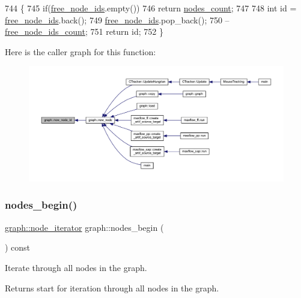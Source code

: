 \begin{DoxyCode}
744 \{
745     \textcolor{keywordflow}{if}(\mbox{\hyperlink{classgraph_ae3f535853434924927a21d7725445aab}{free\_node\_ids}}.empty())
746     \textcolor{keywordflow}{return} \mbox{\hyperlink{classgraph_a1f59223d0bcf647920963d7a661dd74a}{nodes\_count}};
747    
748     \textcolor{keywordtype}{int} \textcolor{keywordtype}{id} = \mbox{\hyperlink{classgraph_ae3f535853434924927a21d7725445aab}{free\_node\_ids}}.back();
749     \mbox{\hyperlink{classgraph_ae3f535853434924927a21d7725445aab}{free\_node\_ids}}.pop\_back();
750     --\mbox{\hyperlink{classgraph_a9480e2310fe64c3a8ad295bb3f119772}{free\_node\_ids\_count}};
751     \textcolor{keywordflow}{return} id;
752 \}
\end{DoxyCode}
Here is the caller graph for this function\+:\nopagebreak
\begin{figure}[H]
\begin{center}
\leavevmode
\includegraphics[width=350pt]{classgraph_a4c9af44fa03250994dd1dd972bd7cdfc_icgraph}
\end{center}
\end{figure}
\mbox{\label{classgraph_aec053a4b509d1be804237a80044c54c0}} 
\subsubsection{\texorpdfstring{nodes\+\_\+begin()}{nodes\_begin()}}
{\footnotesize\ttfamily \mbox{\hyperlink{classgraph_a2cb374b84c133ce13f94e73c3e5da7fa}{graph\+::node\+\_\+iterator}} graph\+::nodes\+\_\+begin (\begin{DoxyParamCaption}{ }\end{DoxyParamCaption}) const}

Iterate through all nodes in the graph.

\begin{DoxyReturn}{Returns}
start for iteration through all nodes in the graph. 
\end{DoxyReturn}



